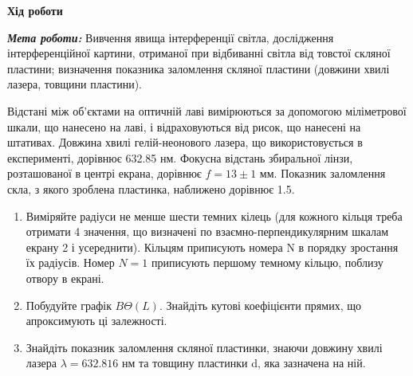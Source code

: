 \begin{center}
    \Large{\textbf{Хід роботи}}    
\end{center}

\vspace{1mm}

\textit{\textbf{Мета роботи:}} Вивчення явища інтерференції світла, дослідження інтерференційної картини,
отриманої при відбиванні світла від товстої скляної пластини; визначення
показника заломлення скляної пластини (довжини хвилі лазера, товщини пластини).
\bigbreak


Відстані між об’єктами на оптичній лаві вимірюються за допомогою
міліметрової шкали, що нанесено на лаві, і відраховуються від рисок, 
що нанесені на штативах. Довжина хвилі гелій-неонового лазера, що 
використовується в експерименті, дорівнює 632.85 нм. Фокусна відстань
збиральної лінзи, розташованої в центрі екрана, дорівнює $f = 13 \pm 1$ мм.
Показник заломлення скла, з якого зроблена пластинка, наближено дорівнює 1.5.

\begin{enumerate}
    \item  Виміряйте радіуси не менше шести темних кілець (для кожного кільця
    треба отримати 4 значення, що визначені по взаємно-перпендикулярним
    шкалам екрану 2 і усереднити). Кільцям приписують номера N в порядку
    зростання їх радіусів. Номер $N = 1$ приписують першому темному кільцю,
    поблизу отвору в екрані.

    \item Побудуйте графік $B \Theta(L)$.
    Знайдіть кутові коефіцієнти 
    прямих, що апроксимують ці залежності.

    \item Знайдіть показник заломлення скляної пластинки, знаючи довжину хвилі
    лазера $\lambda = 632.816$ нм та товщину пластинки d, яка зазначена на ній.
    

\end{enumerate}